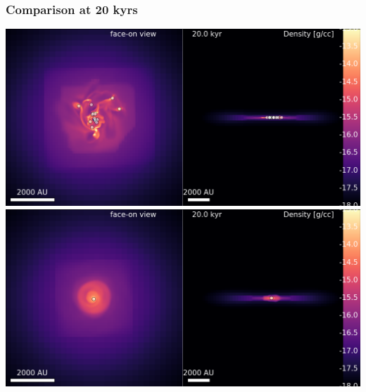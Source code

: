 \documentclass{beamer}
\begin{document}
\begin{frame}
\frametitle{Comparison at 20 kyrs}
 \centering
  \includegraphics[width=0.6\paperwidth]{../Figures/hydro_pure/pure_hydro_2.png}\\
  \includegraphics[width=0.6\paperwidth]{../Figures/rhd/multi_00079.png}\\
\end{frame}
\end{document}
